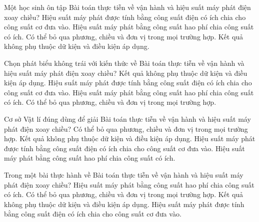 \begin{ex}
Một học sinh ôn tập Bài toán thực tiễn về vận hành và hiệu suất máy phát điện xoay chiều?
\choice
{\True Hiệu suất máy phát được tính bằng công suất điện có ích chia cho công suất cơ đưa vào.}
{Hiệu suất máy phát bằng công suất hao phí chia công suất có ích.}
{Có thể bỏ qua phương, chiều và đơn vị trong mọi trường hợp.}
{Kết quả không phụ thuộc dữ kiện và điều kiện áp dụng.}
\end{ex}

\begin{ex}
Chọn phát biểu không trái với kiến thức về Bài toán thực tiễn về vận hành và hiệu suất máy phát điện xoay chiều?
\choice
{Kết quả không phụ thuộc dữ kiện và điều kiện áp dụng.}
{\True Hiệu suất máy phát được tính bằng công suất điện có ích chia cho công suất cơ đưa vào.}
{Hiệu suất máy phát bằng công suất hao phí chia công suất có ích.}
{Có thể bỏ qua phương, chiều và đơn vị trong mọi trường hợp.}
\end{ex}

\begin{ex}
Cơ sở Vật lí đúng dùng để giải Bài toán thực tiễn về vận hành và hiệu suất máy phát điện xoay chiều?
\choice
{Có thể bỏ qua phương, chiều và đơn vị trong mọi trường hợp.}
{Kết quả không phụ thuộc dữ kiện và điều kiện áp dụng.}
{\True Hiệu suất máy phát được tính bằng công suất điện có ích chia cho công suất cơ đưa vào.}
{Hiệu suất máy phát bằng công suất hao phí chia công suất có ích.}
\end{ex}

\begin{ex}
Trong một bài thực hành về Bài toán thực tiễn về vận hành và hiệu suất máy phát điện xoay chiều?
\choice
{Hiệu suất máy phát bằng công suất hao phí chia công suất có ích.}
{Có thể bỏ qua phương, chiều và đơn vị trong mọi trường hợp.}
{Kết quả không phụ thuộc dữ kiện và điều kiện áp dụng.}
{\True Hiệu suất máy phát được tính bằng công suất điện có ích chia cho công suất cơ đưa vào.}
\end{ex}

